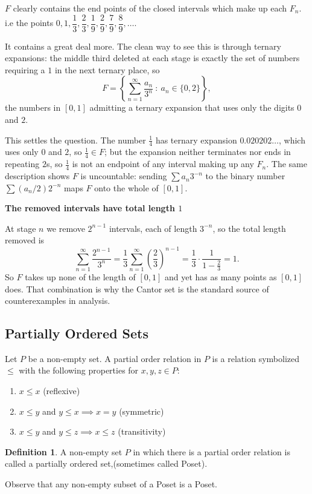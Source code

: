 \documentclass[11pt,a4paper]{article}
\theoremstyle{definition}
\newtheorem{defn}[thm]{Definition}
\newcommand{\subhead}[1]{%
  \par\medskip\noindent\textbf{#1}\par\nobreak\smallskip}
\begin{document}
$F$ clearly contains the end points of the closed intervals which make up each $F_n$. i.e the points $0,1,\dfrac{1}{3},\dfrac{2}{3},\dfrac{1}{9},\dfrac{2}{9},\dfrac{7}{9},\dfrac{8}{9},\dots$.

It contains a great deal more. The clean way to see this is through ternary expansions: the middle third deleted at each stage is exactly the set of numbers requiring a $1$ in the next ternary place, so
$$F=\left\{\sum_{n=1}^{\infty}\frac{a_n}{3^n}\ :\ a_n\in\{0,2\}\right\},$$
the numbers in $[0,1]$ admitting a ternary expansion that uses only the digits $0$ and $2$.

This settles the question. The number $\frac14$ has ternary expansion $0.020202\dots$, which uses only $0$ and $2$, so $\frac14\in F$; but the expansion neither terminates nor ends in repeating $2$s, so $\frac14$ is not an endpoint of any interval making up any $F_n$. The same description shows $F$ is uncountable: sending $\sum a_n3^{-n}$ to the binary number $\sum (a_n/2)2^{-n}$ maps $F$ onto the whole of $[0,1]$.

\subhead{The removed intervals have total length $1$}
At stage $n$ we remove $2^{n-1}$ intervals, each of length $3^{-n}$, so the total length removed is
$$\sum_{n=1}^{\infty}\frac{2^{n-1}}{3^{n}}=\frac13\sum_{n=1}^{\infty}\left(\frac23\right)^{n-1}=\frac13\cdot\frac{1}{1-\frac23}=1 .$$
So $F$ takes up none of the length of $[0,1]$ and yet has as many points as $[0,1]$ does. That combination is why the Cantor set is the standard source of counterexamples in analysis.


\pagebreak

\subsection{Partially Ordered Sets}

Let $P$ be a non-empty set. A partial order relation in $P$ is a relation symbolized $\leq$ with the following properties for $x,y,z\in P$:
\begin{enumerate}
\item[i] $x\leq x$ (reflexive)
\item[ii] $x\leq y$ and $y\leq x\implies x=y$ (symmetric)
\item[iii] $x\leq y$  and $y\leq z\implies x\leq z$ (transitivity)
\end{enumerate}   

\begin{defn}
A non-empty set $P$ in which there is a partial order relation is called a partially ordered set,(sometimes called Poset).

Observe that any non-empty subset of a Poset is a Poset.

\end{defn}
\end{document}
